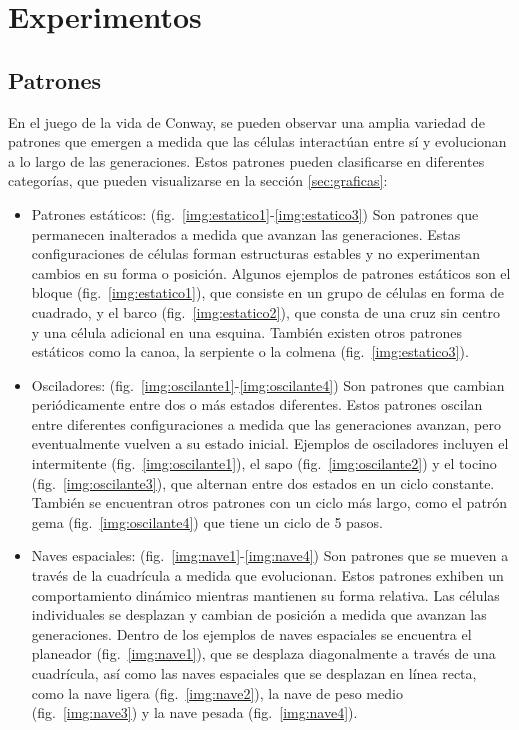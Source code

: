 \documentclass[12pt]{article}
\begin{document}
\section{Experimentos}


\subsection*{Patrones}

En el juego de la vida de Conway, se pueden observar una amplia variedad de patrones que emergen a medida que las células interactúan entre sí y evolucionan a lo largo de las generaciones. Estos patrones pueden clasificarse en diferentes categorías, que pueden visualizarse en la sección \ref{sec:graficas}:

\begin{itemize}
  \item Patrones estáticos: (fig.~\ref{img:estatico1}-\ref{img:estatico3}) Son patrones que permanecen inalterados a medida que avanzan las generaciones. Estas configuraciones de células forman estructuras estables y no experimentan cambios en su forma o posición. Algunos ejemplos de patrones estáticos son el bloque (fig.~\ref{img:estatico1}), que consiste en un grupo de células en forma de cuadrado, y el barco (fig.~\ref{img:estatico2}), que consta de una cruz sin centro y una célula adicional en una esquina. También existen otros patrones estáticos como la canoa, la serpiente o la colmena (fig.~\ref{img:estatico3}).

  \item Osciladores: (fig.~\ref{img:oscilante1}-\ref{img:oscilante4}) Son patrones que cambian periódicamente entre dos o más estados diferentes. Estos patrones oscilan entre diferentes configuraciones a medida que las generaciones avanzan, pero eventualmente vuelven a su estado inicial. Ejemplos de osciladores incluyen el intermitente (fig.~\ref{img:oscilante1}), el sapo (fig.~\ref{img:oscilante2}) y el tocino (fig.~\ref{img:oscilante3}), que alternan entre dos estados en un ciclo constante. También se encuentran otros patrones con un ciclo más largo, como el patrón gema (fig.~\ref{img:oscilante4}) que tiene un ciclo de 5 pasos.

  \item Naves espaciales: (fig.~\ref{img:nave1}-\ref{img:nave4}) Son patrones que se mueven a través de la cuadrícula a medida que evolucionan. Estos patrones exhiben un comportamiento dinámico mientras mantienen su forma relativa. Las células individuales se desplazan y cambian de posición a medida que avanzan las generaciones. Dentro de los ejemplos de naves espaciales se encuentra el planeador (fig.~\ref{img:nave1}), que se desplaza diagonalmente a través de una cuadrícula, así como las naves espaciales que se desplazan en línea recta, como la nave ligera (fig.~\ref{img:nave2}), la nave de peso medio (fig.~\ref{img:nave3}) y la nave pesada (fig.~\ref{img:nave4}).
\end{itemize}
\end{document}
